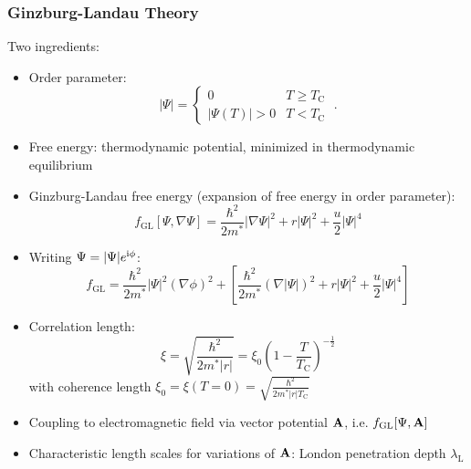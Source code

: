 \documentclass[aspectratio=169]{beamer}
\begin{document}
\begin{frame}
	\frametitle{Ginzburg-Landau Theory}
	
	Two ingredients:
	\begin{itemize}
		\item Order parameter:
		\begin{equation}
			\vert \Psi \vert =
			\begin{cases}
				0 & T \geq T_{\mathrm{C}} \\
				\vert \Psi (T) \vert > 0 & T < T_{\mathrm{C}}
			\end{cases} \;.
		\end{equation}
		\item Free energy: thermodynamic potential, minimized in thermodynamic equilibrium
		\item Ginzburg-Landau free energy (expansion of free energy in order parameter):
		\begin{equation}
			f_{\mathrm{GL}} [\Psi, \nabla \Psi] = \frac{\hbar^2}{2m^*} \vert \nabla \Psi \vert^2 + r \vert \Psi \vert^2 + \frac{u}{2} \vert \Psi \vert^4
		\end{equation}
	\end{itemize}
\end{frame}

\begin{frame}
	\begin{itemize}

		\item Writing \(\Psi = \vert \Psi \vert e^{\mathrm{i} \phi}\):
		\begin{equation}
			f_{\mathrm{GL}}  = \frac{\hbar^2}{2m^*} \vert \Psi \vert^2 (\nabla \phi)^2 + \left[ \frac{\hbar^2}{2m^*} (\nabla \vert \Psi \vert)^2 + r \vert \Psi \vert^2 + \frac{u}{2} \vert \Psi \vert^4 \right]
		\end{equation}
		\item Correlation length:
		\begin{equation}
			\xi = \sqrt{\frac{\hbar^2}{2m^* \vert r \vert}} = \xi_0 \left(1 - \frac{T}{T_{\mathrm{C}}}\right)^{-\frac{1}{2}}
		\end{equation}
		with coherence length \(\xi_0 = \xi(T=0) = \sqrt{\frac{\hbar^2}{2 m^* \vert r \vert T_{\mathrm{C}}}}\)
		\item Coupling to electromagnetic field via vector potential \(\mathbf{A}\), i.e. \(f_{\mathrm{GL}} [\Psi, \mathbf{A}]\)
		\item Characteristic length scales for variations of \(\mathbf{A}\): London penetration depth \(\lambda_{\mathrm{L}}\)
	\end{itemize}
\end{frame}
\end{document}

